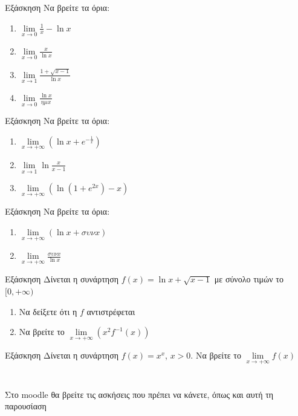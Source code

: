 \documentclass[greek]{beamer}
\begin{document}
\begin{frame}{Εξάσκηση}
      Να βρείτε τα όρια:
      \begin{enumerate}
            \item $\lim\limits_{x \to 0}{ \frac{1}{x}-\ln x }$ \pause
            \item $\lim\limits_{x \to 0}{ \frac{x}{\ln x} }$\pause
            \item $\lim\limits_{x \to 1}{ \frac{1+\sqrt{x-1}}{\ln x}}$\pause
            \item $\lim\limits_{x \to 0}{ \frac{\ln x}{ημx}}$
      \end{enumerate}
\end{frame}

\begin{frame}{Εξάσκηση}
      Να βρείτε τα όρια:
      \begin{enumerate}
            \item $\lim\limits_{x \to +\infty}{\left(    \ln x + e^{-\frac{1}{x}} \right)}$ \pause
            \item $\lim\limits_{x \to 1}{ \ln\frac{x}{x-1} }$\pause
            \item $\lim\limits_{x \to +\infty}{\left( \ln (1+e^{2x})-x \right)}$
      \end{enumerate}
\end{frame}

\begin{frame}{Εξάσκηση}
      Να βρείτε τα όρια:
      \begin{enumerate}
            \item $\lim\limits_{x \to +\infty}{\left( \ln x+συνx \right)}$ \pause
            \item $\lim\limits_{x \to +\infty}{ \frac{συνx}{\ln x} }$
      \end{enumerate}
\end{frame}

\begin{frame}{Εξάσκηση}
      Δίνεται η συνάρτηση $f(x)=\ln x + \sqrt{x-1}$ με σύνολο τιμών το $[0,+\infty)$
      \begin{enumerate}
            \item Να δείξετε ότι η $f$ αντιστρέφεται \pause
            \item Να βρείτε το $\lim\limits_{x \to +\infty}{ \left( x^2f^{-1}(x) \right)  }$
      \end{enumerate}
\end{frame}

\begin{frame}{Εξάσκηση}
      Δίνεται η συνάρτηση $f(x)=x^x$, $x>0$. Να βρείτε το $\lim\limits_{x \to +\infty}{ f(x)  }$
\end{frame}

\section{}
\begin{frame}
      Στο moodle θα βρείτε τις ασκήσεις που πρέπει να κάνετε, όπως και αυτή τη παρουσίαση
\end{frame}
\end{document}
